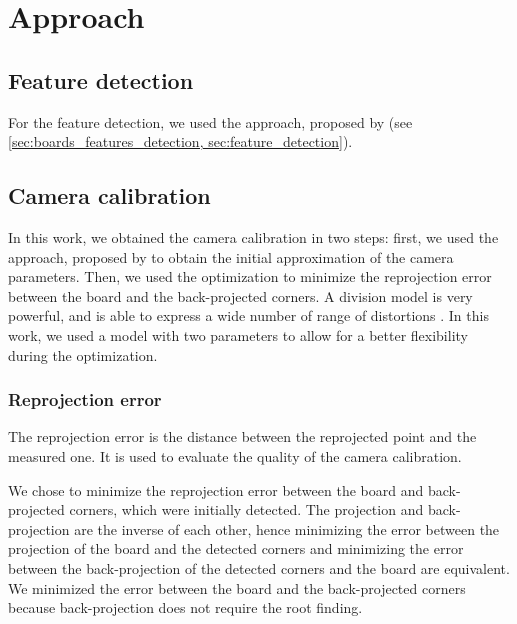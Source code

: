 \chapter{Approach}\label{cha:approach}

\section{Feature detection}\label{sec:feature_detection}

For the feature detection, we used the approach, proposed by
\cite{geigerAutomaticCameraRange2012} (see \cref{sec:boards_features_detection,
	sec:feature_detection}).

\section{Camera calibration}\label{sec:camera_calibration}

In this work, we obtained the camera calibration in two steps: first, we
used the approach, proposed by \cite{scaramuzzaToolboxEasilyCalibrating2006} to
obtain the initial approximation of the camera parameters. Then, we used the
optimization to minimize the reprojection error between the board and the
back-projected corners. A division model is very powerful, and is able to
express a wide number of range of distortions
\citep{prittsMinimalSolversRectifying2021}. In this work, we used a model with
two parameters to allow for a better flexibility during the optimization.

\subsection{Reprojection error}\label{sub:reprojection_error}

The reprojection error is the distance between the reprojected point and the
measured one. It is used to evaluate the quality of the camera calibration.

We chose to minimize the reprojection error between the board and back-projected
corners, which were initially detected. The projection and back-projection are
the inverse of each other, hence minimizing the error between the projection of
the board and the detected corners and minimizing the error between the
back-projection of the detected corners and the board are
equivalent. We minimized the error
between the board and the back-projected corners because back-projection does
not require the root finding.

